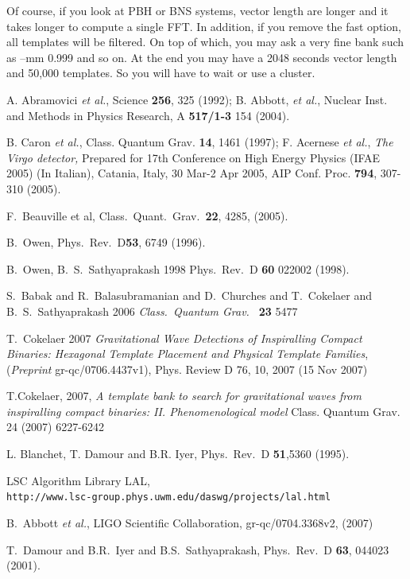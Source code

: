 \documentclass[a4paper,10pt]{article}
\begin{document}
Of course, if you look at PBH or BNS systems, vector length are longer and it takes longer to compute a single FFT. In addition, if you remove the fast option, all templates will be filtered. On top of which, you may ask a very fine bank such as --mm 0.999 and so on. At the end you may have a 2048 seconds vector length and 50,000 templates. So you will have to wait or use a cluster. 

\begin{thebibliography}{99}
A. Abramovici {\it et al.}, Science {\bf 256}, 325 (1992);
B. Abbott, {\it et al.}, Nuclear Inst. and Methods in Physics 
Research, A {\bf 517/1-3} 154 (2004).

B. Caron {\it et al.}, Class. Quantum Grav. {\bf 14}, 1461 (1997);
F. Acernese {\it et al.}, {\em The Virgo detector,} 
Prepared for 17th Conference on High Energy Physics (IFAE 2005) (In Italian), 
Catania, Italy, 30 Mar-2 Apr 2005,  AIP Conf. Proc. {\bf 794}, 307-310 (2005).

F.~Beauville et al, Class.\ Quant.\ Grav.\ \textbf{22}, 4285, (2005).

B.~Owen, Phys.\ Rev.\  D\textbf {53}, 6749 (1996).

 B.~Owen, B.~S.~Sathyaprakash 1998 Phys.\ Rev.\ 
D \textbf{60} 022002 (1998).

S.~Babak and R.~Balasubramanian and D.~Churches and T.~Cokelaer and B.~S.~Sathyaprakash 2006 \textit{Class.\ Quantum Grav.\ }
\textbf{23} 5477

 T.~Cokelaer 2007 \textit{Gravitational Wave Detections of Inspiralling Compact Binaries: Hexagonal Template Placement and Physical Template Families}, (\textit{Preprint} gr-qc/0706.4437v1), Phys. Review D 76, 10, 2007 (15 Nov 2007) 


 T.Cokelaer, 2007, \textit{A template bank to search for gravitational waves from inspiralling compact binaries: II. Phenomenological model}
Class. Quantum Grav. 24 (2007) 6227-6242 


 L. Blanchet, T. Damour and B.R. Iyer, Phys.\ Rev.\ D {\bf 51},5360 (1995).

 LSC Algorithm Library LAL,\\
{\tt http://www.lsc-group.phys.uwm.edu/daswg/\-projects/lal.html}

B.~Abbott {\it et al.}, LIGO Scientific Collaboration, gr-qc/0704.3368v2,
(2007)

T.~Damour and B.R.~Iyer and B.S.~Sathyaprakash, Phys.\ Rev.\ D
\textbf{63}, 044023 (2001).

\end{thebibliography}


\label{theend}
\end{document}

